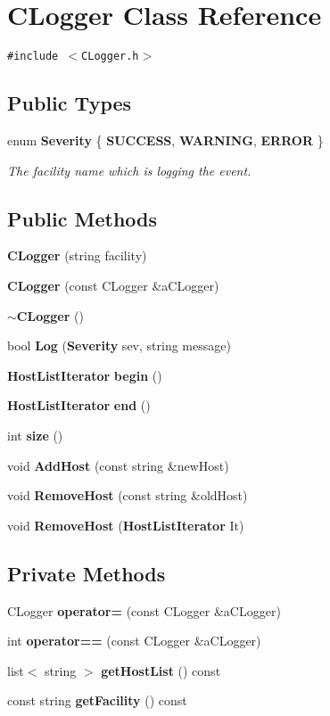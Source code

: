 \section{CLogger  Class Reference}
\label{classCLogger}
{\tt \#include $<$CLogger.h$>$}

\subsection*{Public Types}
\begin{CompactItemize}
\item 
enum {\bf Severity} \{ {\bf SUCCESS}, 
{\bf WARNING}, 
{\bf ERROR}
 \}
\begin{CompactList}\small\item\em The facility name which is logging the event.\item\end{CompactList}\end{CompactItemize}
\subsection*{Public Methods}
\begin{CompactItemize}
\item 
{\bf CLogger} (string facility)
\item 
{\bf CLogger} (const CLogger \&a\-CLogger)
\item 
{\bf $\sim$CLogger} ()
\item 
bool {\bf Log} ({\bf Severity} sev, string message)
\item 
{\bf Host\-List\-Iterator} {\bf begin} ()
\item 
{\bf Host\-List\-Iterator} {\bf end} ()
\item 
int {\bf size} ()
\item 
void {\bf Add\-Host} (const string \&new\-Host)
\item 
void {\bf Remove\-Host} (const string \&old\-Host)
\item 
void {\bf Remove\-Host} ({\bf Host\-List\-Iterator} It)
\end{CompactItemize}
\subsection*{Private Methods}
\begin{CompactItemize}
\item 
CLogger {\bf operator=} (const CLogger \&a\-CLogger)
\item 
int {\bf operator==} (const CLogger \&a\-CLogger)
\item 
list$<$ string $>$ {\bf get\-Host\-List} () const
\item 
const string {\bf get\-Facility} () const
\end{CompactItemize}
